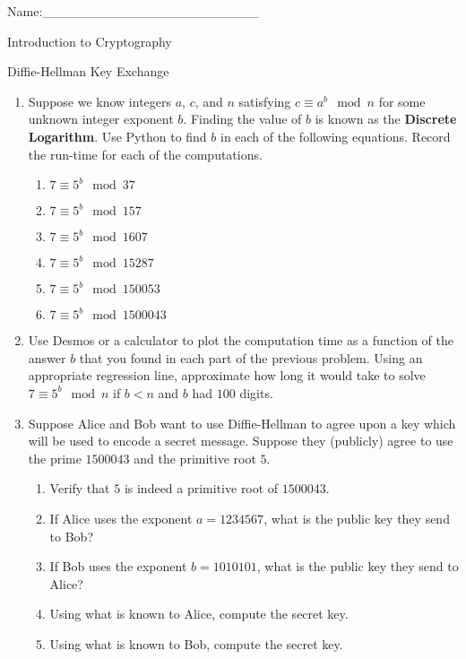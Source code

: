 \documentclass[12pt]{amsart}
\theoremstyle{definition}
\theoremstyle{remark}
\numberwithin{equation}{section}
\begin{document}
\begin{flushright}
Name:\_\_\_\_\_\_\_\_\_\_\_\_\_\_\_\_\_\_\_\_\_\_\_
\end{flushright}
\vspace{10pt}
\begin{center}
Introduction to Cryptography

Diffie-Hellman Key Exchange
\end{center}



\begin{enumerate}
\item Suppose we know integers $a$, $c$, and $n$ satisfying $c\equiv a^b\mod n$ for some unknown integer exponent $b$. Finding the value of $b$ is known as the {\bf Discrete Logarithm}. Use Python to find $b$ in each of the following equations. Record the run-time for each of the computations.
\begin{enumerate}
\item $7\equiv 5^b\mod 37$
\item $7\equiv 5^b\mod 157$
\item $7\equiv 5^b\mod 1607$
\item $7\equiv 5^b\mod 15287$
\item $7\equiv 5^b\mod 150053$
\item $7\equiv 5^b\mod 1500043$
\end{enumerate}
\item Use Desmos or a calculator to plot the computation time as a function of the answer $b$ that you found in each part of the previous problem. Using an appropriate regression line, approximate how long it would take to solve $7\equiv 5^b\mod n$ if $b<n$ and $b$ had $100$ digits.
\item Suppose Alice and Bob want to use Diffie-Hellman to agree upon a key which will be used to encode a secret message. Suppose they (publicly) agree to use the prime $1500043$ and the primitive root $5$.
\begin{enumerate}
\item Verify that $5$ is indeed a primitive root of $1500043$.
\item If Alice uses the exponent $a=1234567$, what is the public key they send to Bob?
\item If Bob uses the exponent $b=1010101$, what is the public key they send to Alice?
\item Using what is known to Alice, compute the secret key.
\item Using what is known to Bob, compute the secret key.

\end{enumerate}
\end{enumerate}
\end{document}
